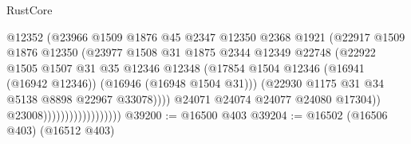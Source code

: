 \begin{lexlean}{RustCore}
\begin{coremodule}
                                          @12352
                                          (@23966
                                            @1509
                                            @1876
                                            @45
                                            @2347
                                            @12350
                                            @2368
                                            @1921
                                            (@22917
                                              @1509
                                              @1876
                                              @12350
                                              (@23977
                                                @1508
                                                @31
                                                @1875
                                                @2344
                                                @12349
                                                @22748
                                                (@22922
                                                  @1505
                                                  @1507
                                                  @31
                                                  @35
                                                  @12346
                                                  @12348
                                                  (@17854
                                                    @1504
                                                    @12346
                                                    (@16941 (@16942 @12346))
                                                    (@16946 (@16948 @1504 @31)))
                                                  (@22930
                                                    @1175
                                                    @31
                                                    @34
                                                    @5138
                                                    @8898
                                                    @22967
                                                    @33078))))
                                            @24071
                                            @24074
                                            @24077
                                            @24080
                                            @17304))
                                        @23008))))))))))))))))))
@39200 := @16500 @403
@39204 := @16502 (@16506 @403) (@16512 @403)

\end{coremodule}
\end{lexlean}
